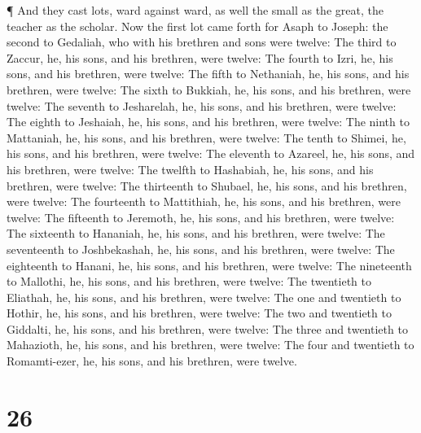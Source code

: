  ¶ And they cast lots, ward against ward, as well the small
as the great, the teacher as the scholar.  Now the first lot
came forth for Asaph to Joseph: the second to Gedaliah, who with his
brethren and sons were twelve:  The third to Zaccur, he,
his sons, and his brethren, were twelve:  The fourth to
Izri, he, his sons, and his brethren, were twelve:  The
fifth to Nethaniah, he, his sons, and his brethren, were twelve:
 The sixth to Bukkiah, he, his sons, and his brethren, were
twelve:  The seventh to Jesharelah, he, his sons, and his
brethren, were twelve:  The eighth to Jeshaiah, he, his
sons, and his brethren, were twelve:  The ninth to
Mattaniah, he, his sons, and his brethren, were twelve: 
The tenth to Shimei, he, his sons, and his brethren, were twelve:
 The eleventh to Azareel, he, his sons, and his brethren,
were twelve:  The twelfth to Hashabiah, he, his sons, and
his brethren, were twelve:  The thirteenth to Shubael, he,
his sons, and his brethren, were twelve:  The fourteenth to
Mattithiah, he, his sons, and his brethren, were twelve: 
The fifteenth to Jeremoth, he, his sons, and his brethren, were twelve:
 The sixteenth to Hananiah, he, his sons, and his brethren,
were twelve:  The seventeenth to Joshbekashah, he, his
sons, and his brethren, were twelve:  The eighteenth to
Hanani, he, his sons, and his brethren, were twelve:  The
nineteenth to Mallothi, he, his sons, and his brethren, were twelve:
 The twentieth to Eliathah, he, his sons, and his brethren,
were twelve:  The one and twentieth to Hothir, he, his
sons, and his brethren, were twelve:  The two and twentieth
to Giddalti, he, his sons, and his brethren, were twelve: 
The three and twentieth to Mahazioth, he, his sons, and his brethren,
were twelve:  The four and twentieth to Romamti-ezer, he,
his sons, and his brethren, were twelve.

\hypertarget{section-25}{%
\section{26}\label{section-25}}

